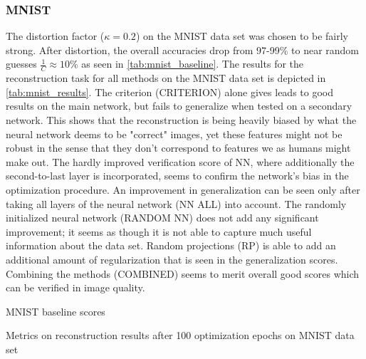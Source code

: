 \subsubsection{MNIST}


The distortion factor ($\kappa = 0.2$) on the MNIST data set was chosen to be fairly strong.
After distortion, the overall accuracies drop from 97-99\% to near random guesses $\frac 1 C \approx 10\%$
as seen in \cref{tab:mnist_baseline}.
The results for the reconstruction task for all methods on the MNIST data set is depicted in \cref{tab:mnist_results}.
The criterion (CRITERION) alone gives leads to good results on the main network, but fails to generalize when tested on a secondary network.
This shows that the reconstruction is being heavily biased by what the neural network deems to be "correct" images, 
yet these features might not be robust in the sense that they don't correspond to features we as humans might make out.
The hardly improved verification score of NN, where additionally the second-to-last layer is 
incorporated, seems to confirm
the network's bias in the optimization procedure. 
An improvement in generalization can be seen only after taking 
all layers of the neural network (NN ALL) into account.
The randomly initialized neural network (RANDOM NN) does not add any significant improvement; 
it seems as though it is not able to capture much useful information about the data set.
Random projections (RP) is able to add an additional amount of regularization that is seen in the generalization scores.
Combining the methods (COMBINED) seems to merit overall good scores which can be verified in image quality.


\begin{table}[!htbp]
\centering
\footnotesize
{}
\caption{MNIST baseline scores}
\label{tab:mnist_baseline}
\end{table}

\begin{table}[!htbp]
\centering
\footnotesize
{}
\caption{Metrics on reconstruction results after 100 optimization epochs on MNIST data set}
\label{tab:mnist_results}
\end{table}


